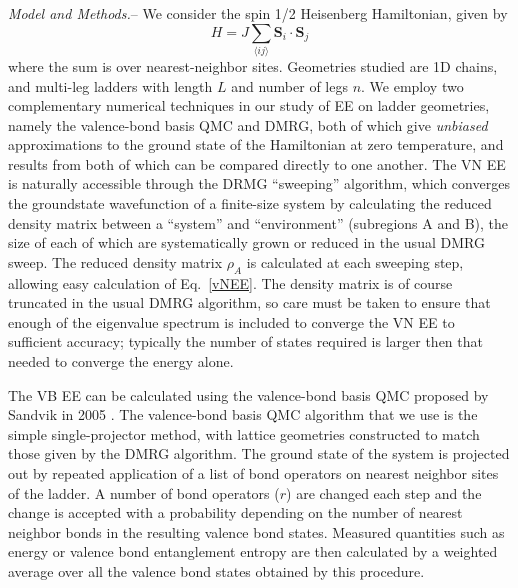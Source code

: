 \documentclass[prl,aps,twocolumn,floatfix,amsmath,amssymb,superscriptaddress,tightenlines]{revtex4}
\begin{document}
{\it Model and Methods.}-- We consider the spin 1/2 Heisenberg Hamiltonian, given by
\begin{equation}
H = J \sum_{\langle i j \rangle} {\mathbf S}_i \cdot {\mathbf S}_j \label{ham}
\end{equation}
where the sum is over nearest-neighbor sites.  Geometries studied are 1D chains, and multi-leg ladders with length $L$ and number of legs $n$.  
We employ two complementary numerical techniques in our study of EE on ladder geometries, namely the valence-bond basis QMC and DMRG, both of which give {\it unbiased} approximations to the ground state of the Hamiltonian at zero temperature, and results from both of which can be compared directly to one another.  
The VN EE is naturally accessible through the DRMG ``sweeping'' algorithm, which converges the groundstate wavefunction of a finite-size system by calculating the reduced density matrix between a ``system'' and ``environment'' (subregions A and B), the size of each of which are systematically grown or reduced in the usual DMRG sweep.  The reduced density matrix $\rho_A$ is calculated at each sweeping step, allowing easy calculation of Eq.~\ref{vNEE}.  The density matrix is of course truncated in the usual DMRG algorithm, so care must be taken to ensure that enough of the eigenvalue spectrum is included to converge the VN EE to sufficient accuracy; typically the number of states required is larger then that needed to converge the energy alone.

The VB EE can be calculated using the valence-bond basis QMC proposed by Sandvik in 2005 \cite{Sandvik}.
The valence-bond basis QMC algorithm that we use is the simple single-projector method, with lattice geometries constructed to match those given by the DMRG algorithm.  The ground state of the system is projected out by repeated application of a list of bond operators on nearest neighbor sites of the ladder.  A number of bond operators ($r$) are changed each step and the change is accepted with a probability depending on the number of nearest neighbor bonds in the resulting valence bond states.  Measured quantities such as energy or valence bond entanglement entropy are then calculated by a weighted average over all the valence bond states obtained by this procedure.
\end{document}
